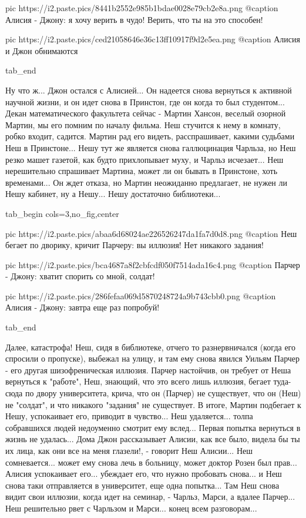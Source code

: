 		 pic https://i2.paste.pics/8441b2552e985b1bdae0028e79cb2e8a.png
		 @caption Алисия - Джону: я хочу верить в чудо! Верить, что ты на это способен!

		 pic https://i2.paste.pics/ced21058646e36c13ff10917f9d2e5ea.png
		 @caption Алисия и Джон обнимаются

  tab_end
\fi

Ну что ж... Джон остался с Алисией... Он надеется снова вернуться к активной
научной жизни, и он идет снова в Принстон, где он когда то был студентом...
Декан математического факультета сейчас - Мартин Хансон, веселый озорной
Мартин, мы его помним по началу фильма. Неш стучится к нему в комнату, робко
входит, садится. Мартин рад его видеть, расспрашивает, какими судьбами Неш в
Принстоне... Нешу тут же является снова галлюцинация Чарльза, но Неш резко
машет газетой, как будто прихлопывает муху, и Чарльз исчезает... Неш
нерешительно спрашивает Мартина, может ли он бывать в Принстоне, хоть
временами... Он ждет отказа, но Мартин неожиданно предлагает, не нужен ли Нешу
кабинет, ну а Нешу... Нешу достаточно библиотеки...


\ifcmt
  tab_begin cols=3,no_fig,center

     pic https://i2.paste.pics/abaa6d68024ae226526247da1fa7d0d8.png
		 @caption Неш бегает по дворику, кричит Парчеру: вы иллюзия! Нет никакого задания!

		 pic https://i2.paste.pics/bca4687a8f2cbfcdf050f7514ada16c4.png
		 @caption Парчер - Джону: хватит спорить со мной, солдат!

		 pic https://i2.paste.pics/286fefaa069d5870248724a9b743cbb0.png
		 @caption Алисия - Джону: завтра еще раз попробуй!

  tab_end
\fi

Далее, катастрофа! Неш, сидя в библиотеке, отчего то разнервничался (когда его
спросили о пропуске), выбежал на улицу, и там ему снова явился Уильям Парчер -
его другая шизофреническая иллюзия. Парчер настойчив, он требует от Неша
вернуться к "работе", Неш, знающий, что это всего лишь иллюзия, бегает
туда-сюда по двору университета, крича, что он (Парчер) не существует, что он
(Неш) не "солдат", и что никакого "задания" не существует. В итоге, Мартин
подбегает к Нешу, успокаивает его, приводит в чувство... Неш удаляется... толпа
собравшихся людей недоуменно смотрит ему вслед... Первая попытка вернуться в
жизнь не удалась...  Дома Джон рассказывает Алисии, как все было, видела бы ты
их лица, как они все на меня глазели!, - говорит Неш Алисии... Неш
сомневается...  может ему снова лечь в больницу, может доктор Розен был прав...
Алисия успокаивает его...  убеждает его, что нужно пробовать снова... и Неш
снова таки отправляется в университет, еще одна попытка... Там Неш снова видит
свои иллюзии, когда идет на семинар, - Чарльз, Марси, а вдалее Парчер... Неш
решительно рвет с Чарльзом и Марси...  конец всем разговорам...

